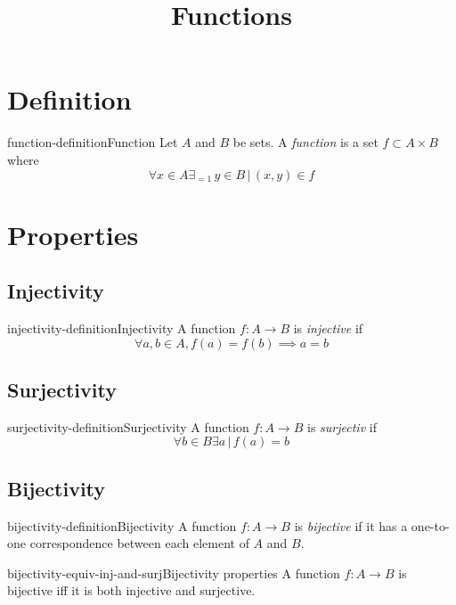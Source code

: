 \documentclass[preview]{standalone}
\begin{document}
\title{Functions}
\genpage

\section{Definition}

\begin{snippetdefinition}{function-definition}{Function}{
    Let \(A\) and \(B\) be sets.
    A \textit{function} is a set \(f \subset A \times B\) where
    \[
        \forall x \in A \exists_{=1} \, y \in B \,|\, (x,y) \in f
    \]
}
\end{snippetdefinition}

\section{Properties}

\subsection{Injectivity}

\begin{snippetdefinition}{injectivity-definition}{Injectivity}{
    A function \(f:A\to B\) is \textit{injective} if
    \[
        \forall a,b \in A, f(a) = f(b) \implies a = b
    \]
}
\end{snippetdefinition}

\subsection{Surjectivity}

\begin{snippetdefinition}{surjectivity-definition}{Surjectivity}{
    A function \(f:A\to B\) is \textit{surjectiv} if
    \[
        \forall b \in B \exists a \,|\, f(a)=b
    \]
}
\end{snippetdefinition}

\subsection{Bijectivity}

\begin{snippetdefinition}{bijectivity-definition}{Bijectivity}{
    A function \(f:A\to B\) is \textit{bijective} if
    it has a one-to-one correspondence between each element of \(A\) and  \(B\).
}
\end{snippetdefinition}

\begin{snippetcorollary}{bijectivity-equiv-inj-and-surj}{Bijectivity properties}{
    A function \(f:A\to B\) is bijective iff it is both injective and surjective.
}
\end{snippetcorollary}
\end{document}

